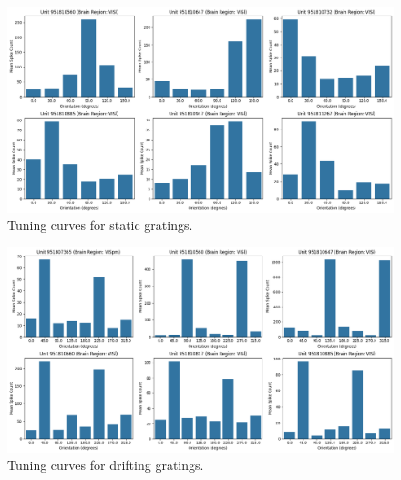 \documentclass[10pt,twocolumn]{article}
\begin{document}
\begin{figure}[H]
  \centering
  \includegraphics[width=\linewidth]{report_images/static_tuning_curves.png}
  \caption{Tuning curves for static gratings.}
  \label{fig:static_tuning}
\end{figure}

\begin{figure}[H]
  \centering
  \includegraphics[width=\linewidth]{report_images/Drifting_tuning_curves.png}
  \caption{Tuning curves for drifting gratings.}
  \label{fig:drifting_tuning}
\end{figure}
\end{document}
